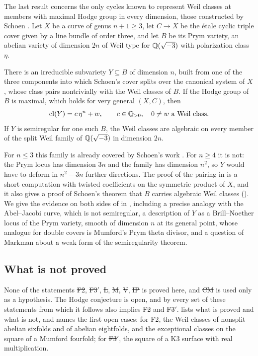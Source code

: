 The last result concerns the only cycles known to represent Weil classes at
members with maximal Hodge group in every dimension, those constructed by
Schoen \cite{Sch88}. Let $X$ be a curve of genus $n+1\ge3$, let $C\to X$ be
the \'etale cyclic triple cover given by a line bundle of order three, and
let $B$ be its Prym variety, an abelian variety of dimension $2n$ of Weil
type for $\mathbb{Q}(\sqrt{-3})$ with polarization class $\eta$.

\begin{maintheorem}\label{thm:schoenY}
There is an irreducible subvariety $Y\subseteq B$ of dimension $n$, built
from one of the three components into which Schoen's cover splits over the
canonical system of $X$, whose class pairs nontrivially with the Weil
classes of $B$. If the Hodge group of $B$ is maximal, which holds for very
general $(X,C)$, then
\[
  \operatorname{cl}(Y)=c\,\eta^{n}+w,\qquad c\in\mathbb{Q}_{>0},\quad 0\ne w\ \text{a Weil class}.
\]
If $Y$ is semiregular for one such $B$, the Weil classes are algebraic on
every member of the split Weil family of $\mathbb{Q}(\sqrt{-3})$ in dimension $2n$.
\end{maintheorem}

For $n\le3$ this family is already covered by Schoen's work \cite{Sch88,Sch98}.
For $n\ge4$ it is not: the Prym locus has
dimension $3n$ and the family has dimension $n^{2}$, so $Y$ would have to
deform in $n^{2}-3n$ further directions. The proof of the pairing in  is a short computation with
twisted coefficients on the symmetric product of $X$, and it also gives a
proof of Schoen's theorem that $B$ carries algebraic Weil classes
(). We give the evidence on both sides of 
in , including a precise analogy
with the Abel--Jacobi curve, which is not semiregular, a description of $Y$
as a Brill--Noether locus of the Prym variety, smooth of dimension $n$ at its
general point, whose analogue for double covers is Mumford's Prym theta
divisor, and a question of Markman about a weak form of the semiregularity
theorem.

\subsection*{What is not proved}
None of the statements \st{F2}, \st{F3$'$}, \st{L}, \st{M}, \st{V},
\st{IP} is proved here, and \st{CM} is used only as a hypothesis. The
Hodge conjecture is open, and by  every set of these
statements from which it follows also implies \st{F2} and \st{F3$'$}.
 lists what is proved and what is not, and names the first
open cases: for \st{F2}, the Weil classes of nonsplit abelian sixfolds and
of abelian eightfolds, and the exceptional classes on the square of a
Mumford fourfold; for \st{F3$'$}, the square of a K3 surface with real
multiplication.

